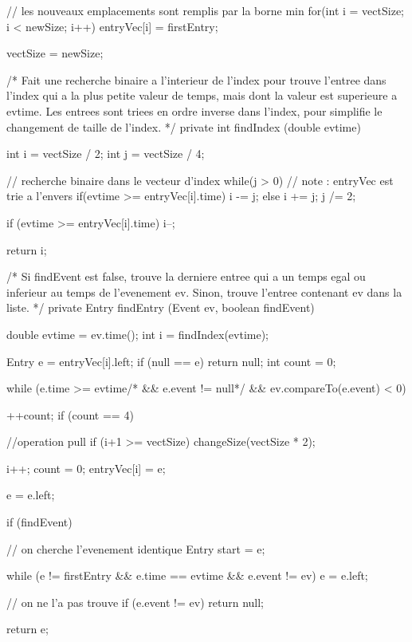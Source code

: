 \begin{code}
\begin{hide}
{{      // les nouveaux emplacements sont remplis par la borne min
      for(int i = vectSize; i < newSize; i++)
         entryVec[i] = firstEntry;

      vectSize = newSize;
   }

   /*
     Fait une recherche binaire a l'interieur de l'index pour trouve
     l'entree dans l'index qui a la plus petite valeur de temps, mais
     dont la valeur est superieure a evtime.
     Les entrees sont triees en ordre inverse dans l'index, pour simplifie
     le changement de taille de l'index.
    */
   private int findIndex (double evtime) {
      int i = vectSize / 2;
      int j = vectSize / 4;

      // recherche binaire dans le vecteur d'index
      while(j > 0) {
         // note : entryVec est trie a l'envers
         if(evtime >= entryVec[i].time)
            i -= j;
         else
            i += j;
         j /= 2;
      }

      if (evtime >= entryVec[i].time)
         i--;

      return i;
   }

   /*
     Si findEvent est false, trouve la derniere entree qui a un temps
     egal ou inferieur au temps de l'evenement ev.
     Sinon, trouve l'entree contenant ev dans la liste.
    */
   private Entry findEntry (Event ev, boolean findEvent) {
      double evtime = ev.time();
      int i = findIndex(evtime);

      Entry e = entryVec[i].left;
      if (null == e) return null;
      int count = 0;

      while (e.time >= evtime/* && e.event != null*/ && ev.compareTo(e.event) < 0) {
         ++count;
         if (count == 4) {
            //operation pull
            if (i+1 >= vectSize)
               changeSize(vectSize * 2);

            i++;
            count = 0;
            entryVec[i] = e;
         }

         e = e.left;
      }

      if (findEvent) {
         // on cherche l'evenement identique
         Entry start = e;

         while (e != firstEntry && e.time == evtime && e.event != ev)
            e = e.left;

         // on ne l'a pas trouve
         if (e.event != ev)
            return null;
      }

      return e;
   }

}\end{hide}
\end{code}
